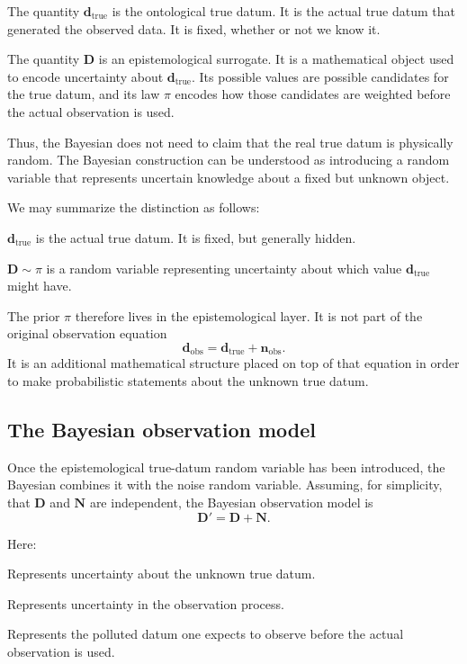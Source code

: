\documentclass[11pt]{article}
\newcommand{\prior}{\pi}
\newcommand{\Drand}{\mathbf D}
\newcommand{\Dobsrand}{\mathbf D'}
\newcommand{\Nrand}{\mathbf N}
\newcommand{\dtrue}{\mathbf d_{\mathrm{true}}}
\newcommand{\dobs}{\mathbf d_{\mathrm{obs}}}
\newcommand{\nobs}{\mathbf n_{\mathrm{obs}}}
\begin{document}
The quantity \(\dtrue\) is the ontological true datum. It is the actual true datum that generated the observed data. It is fixed, whether or not we know it.

The quantity \(\Drand\) is an epistemological surrogate. It is a mathematical object used to encode uncertainty about \(\dtrue\). Its possible values are possible candidates for the true datum, and its law \(\prior\) encodes how those candidates are weighted before the actual observation is used.

Thus, the Bayesian does not need to claim that the real true datum is physically random. The Bayesian construction can be understood as introducing a random variable that represents uncertain knowledge about a fixed but unknown object.

We may summarize the distinction as follows:
\begin{description}[leftmargin=3.1cm,style=nextline]
    \item[Ontological true datum.]
    \(\dtrue\) is the actual true datum. It is fixed, but generally hidden.

    \item[Epistemological true datum.]
    \(\Drand\sim\prior\) is a random variable representing uncertainty about which value \(\dtrue\) might have.
\end{description}

The prior \(\prior\) therefore lives in the epistemological layer. It is not part of the original observation equation
\[
    \dobs=\dtrue+\nobs.
\]
It is an additional mathematical structure placed on top of that equation in order to make probabilistic statements about the unknown true datum.

\subsection{The Bayesian observation model}

Once the epistemological true-datum random variable has been introduced, the Bayesian combines it with the noise random variable. Assuming, for simplicity, that \(\Drand\) and \(\Nrand\) are independent, the Bayesian observation model is
\[
    \Dobsrand=\Drand+\Nrand.
\]

Here:
\begin{description}[leftmargin=2.8cm,style=nextline]
    \item[\(\Drand\).]
    Represents uncertainty about the unknown true datum.

    \item[\(\Nrand\).]
    Represents uncertainty in the observation process.

    \item[\(\Dobsrand\).]
    Represents the polluted datum one expects to observe before the actual observation is used.
\end{description}
\end{document}
